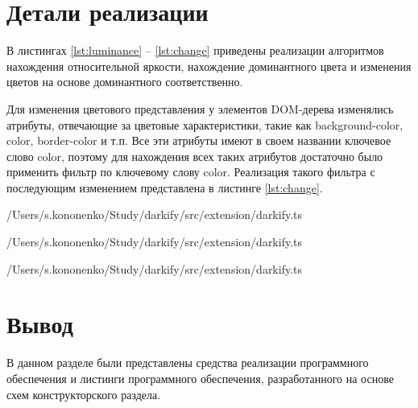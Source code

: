 \section{Детали реализации}

В листингах \ref{lst:luminance} -- \ref{lst:change} приведены реализации алгоритмов нахождения относительной яркости, нахождение доминантного цвета и изменения цветов на основе доминантного соответственно. 

Для изменения цветового представления у элементов DOM-дерева изменялись атрибуты, отвечающие за цветовые характеристики, такие как background-color, color, border-color и т.п. Все эти атрибуты имеют в своем названии ключевое слово color, поэтому для нахождения всех таких атрибутов достаточно было применить фильтр по ключевому слову color. Реализация такого фильтра с последующим изменением представлена в листинге \ref{lst:change}.

\begin{lstinputlisting}[
	caption={Реализация алгоритма нахождения относительной яркости},
	label={lst:luminance},
	style={ES6},
	linerange={80-91},
	]{/Users/s.kononenko/Study/darkify/src/extension/darkify.ts}
\end{lstinputlisting}

\begin{lstinputlisting}[
	caption={Реализация алгоритма нахождения доминантного цвета},
	label={lst:domcolor},
	style={ES6},
	linerange={100-127},
	]{/Users/s.kononenko/Study/darkify/src/extension/darkify.ts}
\end{lstinputlisting}

\begin{lstinputlisting}[
	caption={Реализация алгоритма подбора цветов на основе базовго},
	label={lst:change},
	style={ES6},
	linerange={128-173},
	]{/Users/s.kononenko/Study/darkify/src/extension/darkify.ts}
\end{lstinputlisting}

\section*{Вывод}

В данном разделе были представлены средства реализации программного обеспечения и листинги программного обеспечения, разработанного на основе схем конструкторского раздела.
